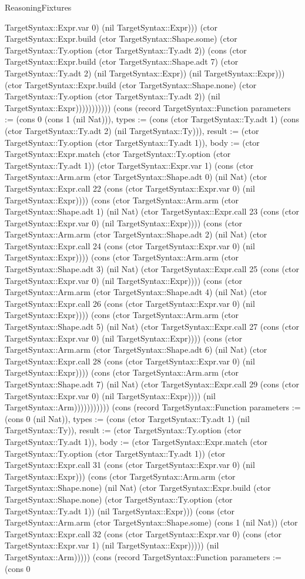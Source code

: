 \begin{lexlean}{ReasoningFixtures}
\begin{semanticmodule}
{TargetSyntax::Expr.var 0) (nil TargetSyntax::Expr))) (ctor TargetSyntax::Expr.build (ctor TargetSyntax::Shape.some) (ctor TargetSyntax::Ty.option (ctor TargetSyntax::Ty.adt 2)) (cons (ctor TargetSyntax::Expr.build (ctor TargetSyntax::Shape.adt 7) (ctor TargetSyntax::Ty.adt 2) (nil TargetSyntax::Expr)) (nil TargetSyntax::Expr))) (ctor TargetSyntax::Expr.build (ctor TargetSyntax::Shape.none) (ctor TargetSyntax::Ty.option (ctor TargetSyntax::Ty.adt 2)) (nil TargetSyntax::Expr))))))))))}) (cons (record TargetSyntax::Function {parameters := (cons 0 (cons 1 (nil Nat))), types := (cons (ctor TargetSyntax::Ty.adt 1) (cons (ctor TargetSyntax::Ty.adt 2) (nil TargetSyntax::Ty))), result := (ctor TargetSyntax::Ty.option (ctor TargetSyntax::Ty.adt 1)), body := (ctor TargetSyntax::Expr.match (ctor TargetSyntax::Ty.option (ctor TargetSyntax::Ty.adt 1)) (ctor TargetSyntax::Expr.var 1) (cons (ctor TargetSyntax::Arm.arm (ctor TargetSyntax::Shape.adt 0) (nil Nat) (ctor TargetSyntax::Expr.call 22 (cons (ctor TargetSyntax::Expr.var 0) (nil TargetSyntax::Expr)))) (cons (ctor TargetSyntax::Arm.arm (ctor TargetSyntax::Shape.adt 1) (nil Nat) (ctor TargetSyntax::Expr.call 23 (cons (ctor TargetSyntax::Expr.var 0) (nil TargetSyntax::Expr)))) (cons (ctor TargetSyntax::Arm.arm (ctor TargetSyntax::Shape.adt 2) (nil Nat) (ctor TargetSyntax::Expr.call 24 (cons (ctor TargetSyntax::Expr.var 0) (nil TargetSyntax::Expr)))) (cons (ctor TargetSyntax::Arm.arm (ctor TargetSyntax::Shape.adt 3) (nil Nat) (ctor TargetSyntax::Expr.call 25 (cons (ctor TargetSyntax::Expr.var 0) (nil TargetSyntax::Expr)))) (cons (ctor TargetSyntax::Arm.arm (ctor TargetSyntax::Shape.adt 4) (nil Nat) (ctor TargetSyntax::Expr.call 26 (cons (ctor TargetSyntax::Expr.var 0) (nil TargetSyntax::Expr)))) (cons (ctor TargetSyntax::Arm.arm (ctor TargetSyntax::Shape.adt 5) (nil Nat) (ctor TargetSyntax::Expr.call 27 (cons (ctor TargetSyntax::Expr.var 0) (nil TargetSyntax::Expr)))) (cons (ctor TargetSyntax::Arm.arm (ctor TargetSyntax::Shape.adt 6) (nil Nat) (ctor TargetSyntax::Expr.call 28 (cons (ctor TargetSyntax::Expr.var 0) (nil TargetSyntax::Expr)))) (cons (ctor TargetSyntax::Arm.arm (ctor TargetSyntax::Shape.adt 7) (nil Nat) (ctor TargetSyntax::Expr.call 29 (cons (ctor TargetSyntax::Expr.var 0) (nil TargetSyntax::Expr)))) (nil TargetSyntax::Arm))))))))))}) (cons (record TargetSyntax::Function {parameters := (cons 0 (nil Nat)), types := (cons (ctor TargetSyntax::Ty.adt 1) (nil TargetSyntax::Ty)), result := (ctor TargetSyntax::Ty.option (ctor TargetSyntax::Ty.adt 1)), body := (ctor TargetSyntax::Expr.match (ctor TargetSyntax::Ty.option (ctor TargetSyntax::Ty.adt 1)) (ctor TargetSyntax::Expr.call 31 (cons (ctor TargetSyntax::Expr.var 0) (nil TargetSyntax::Expr))) (cons (ctor TargetSyntax::Arm.arm (ctor TargetSyntax::Shape.none) (nil Nat) (ctor TargetSyntax::Expr.build (ctor TargetSyntax::Shape.none) (ctor TargetSyntax::Ty.option (ctor TargetSyntax::Ty.adt 1)) (nil TargetSyntax::Expr))) (cons (ctor TargetSyntax::Arm.arm (ctor TargetSyntax::Shape.some) (cons 1 (nil Nat)) (ctor TargetSyntax::Expr.call 32 (cons (ctor TargetSyntax::Expr.var 0) (cons (ctor TargetSyntax::Expr.var 1) (nil TargetSyntax::Expr))))) (nil TargetSyntax::Arm))))}) (cons (record TargetSyntax::Function {parameters := (cons 0 }
\end{semanticmodule}
\end{lexlean}
